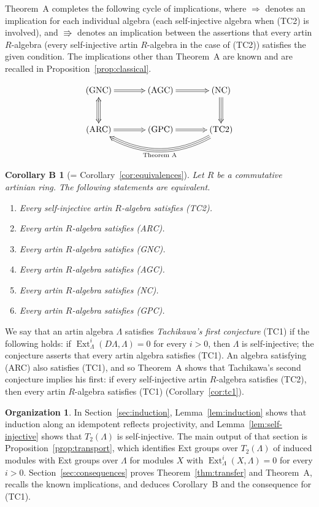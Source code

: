 \documentclass[a4paper,reqno,10pt]{amsart}
\newtheorem*{corollaryB}{Corollary B}
\theoremstyle{definition}
\newtheorem*{organization}{Organization}
\numberwithin{equation}{section}
\newcommand{\Ext}{\operatorname{Ext}}
\newcommand{\ARC}{\textup{(ARC)}}
\newcommand{\GNC}{\textup{(GNC)}}
\newcommand{\AGC}{\textup{(AGC)}}
\newcommand{\NC}{\textup{(NC)}}
\newcommand{\TCone}{\textup{(TC1)}}
\newcommand{\TCtwo}{\textup{(TC2)}}
\newcommand{\GPC}{\textup{(GPC)}}
\begin{document}
Theorem~A completes the following cycle of implications, where
$\Rightarrow$ denotes an implication for each individual algebra (each
self-injective algebra when \TCtwo{} is involved), and $\Rrightarrow$ denotes an
implication between the assertions that every artin $R$-algebra (every
self-injective artin $R$-algebra in the case of \TCtwo) satisfies the given
condition.  The implications other than Theorem~A are known and are
recalled in Proposition~\ref{prop:classical}.

\begin{samepage}
\begin{equation}\label{eq:cycle}
\xymatrix@C=3pc@R=2.5pc{
 \text{\GNC} \ar@{=>}[r] & \text{\AGC} \ar@{=>}[r] & \text{\NC} \ar@3{->}[d] \\
 \text{\ARC} \ar@3{<->}[u] \ar@{=>}[r] & \text{\GPC} \ar@{=>}[r]
 & \text{\TCtwo} \ar@3{->}@/^2pc/[ll]^{\text{Theorem A}}
}
\end{equation}

\begin{corollaryB}[= Corollary~\ref{cor:equivalences}]
Let $R$ be a commutative artinian ring.  The following statements are
equivalent.
\begin{enumerate}
\item Every self-injective artin $R$-algebra satisfies \TCtwo.
\item Every artin $R$-algebra satisfies \ARC.
\item Every artin $R$-algebra satisfies \GNC.
\item Every artin $R$-algebra satisfies \AGC.
\item Every artin $R$-algebra satisfies \NC.
\item Every artin $R$-algebra satisfies \GPC.
\end{enumerate}
\end{corollaryB}
\end{samepage}

We say that an artin algebra $\Lambda$ satisfies \emph{Tachikawa's first
conjecture} \TCone{} \cite[\S8]{Tachikawa} if the following holds: if
$\Ext_\Lambda^i(D\Lambda,\Lambda)=0$ for every $i>0$, then $\Lambda$ is
self-injective; the conjecture asserts that every artin algebra satisfies
\TCone.  An algebra satisfying \ARC{} also satisfies \TCone, and so
Theorem~A shows that Tachikawa's second conjecture implies his first: if
every self-injective artin $R$-algebra satisfies \TCtwo, then every artin
$R$-algebra satisfies \TCone{} (Corollary~\ref{cor:tc1}).

\begin{organization}
In Section~\ref{sec:induction}, Lemma~\ref{lem:induction} shows that
induction along an idempotent reflects projectivity, and
Lemma~\ref{lem:self-injective} shows that $T_2(\Lambda)$ is self-injective.
The main output of that section is Proposition~\ref{prop:transport}, which
identifies Ext groups over $T_2(\Lambda)$ of induced modules with Ext groups
over $\Lambda$ for modules $X$ with $\Ext_\Lambda^i(X,\Lambda)=0$ for every
$i>0$.  Section~\ref{sec:consequences} proves Theorem~\ref{thm:transfer} and
Theorem~A, recalls the known
implications, and deduces Corollary~B and the consequence for \TCone.
\end{organization}
\end{document}
